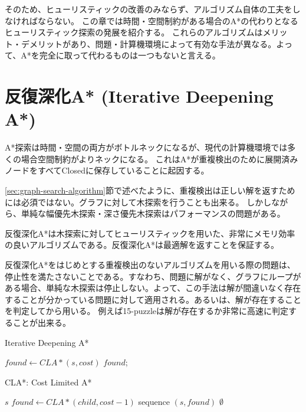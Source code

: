 \documentclass{report}
\begin{document}
そのため、ヒューリスティックの改善のみならず、アルゴリズム自体の工夫をしなければならない。
この章では時間・空間制約がある場合のA*の代わりとなるヒューリスティック探索の発展を紹介する。
これらのアルゴリズムはメリット・デメリットがあり、問題・計算機環境によって有効な手法が異なる。よって、A*を完全に取って代わるものは一つもないと言える。

\section{反復深化A* (Iterative Deepening A*)}
\label{sec:iterative-deepening-astar}

A*探索は時間・空間の両方がボトルネックになるが、現代の計算機環境では多くの場合空間制約がよりネックになる。
これはA*が重複検出のために展開済みノードをすべてClosedに保存していることに起因する。

\ref{sec:graph-search-algorithm}節で述べたように、重複検出は正しい解を返すためには必須ではない。グラフに対して木探索を行うことも出来る。
しかしながら、単純な幅優先木探索・深さ優先木探索はパフォーマンスの問題がある。

反復深化A*は木探索に対してヒューリスティックを用いた、非常にメモリ効率の良いアルゴリズムである。反復深化A*は最適解を返すことを保証する。


反復深化A*をはじめとする重複検出のないアルゴリズムを用いる際の問題は、停止性を満たさないことである。すなわち、問題に解がなく、グラフにループがある場合、単純な木探索は停止しない。よって、この手法は解が間違いなく存在することが分かっている問題に対して適用される。あるいは、解が存在することを判定してから用いる。
例えば15-puzzleは解が存在するか非常に高速に判定することが出来る。



\begin{algorithm}
\caption{Iterative Deepening A*}
\label{alg:iterative-deepening-astar}
	 {
		$found \leftarrow CLA*(s, cost)$\;
		 {
			\Return $found$;
		}
	}
\end{algorithm}

\begin{algorithm}
\caption{CLA*: Cost Limited A*}
\label{alg:implicit-graph-search}
	 {
		\Return $s$\;
	}
	 {
		$found \leftarrow CLA*(child, cost - 1)$\;
		 {
			\Return sequence $(s, found)$\;
		}
	}
	\Return $\emptyset$\;
\end{algorithm}
\end{document}

